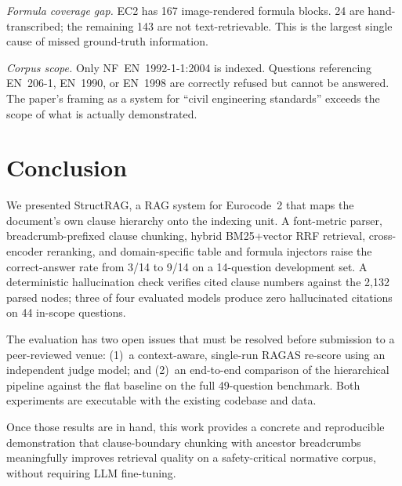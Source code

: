 \documentclass[conference]{IEEEtran}
\begin{document}
\textit{Formula coverage gap.}
EC2 has 167 image-rendered formula blocks.
24 are hand-transcribed; the remaining 143 are not text-retrievable.
This is the largest single cause of missed ground-truth information.

\textit{Corpus scope.}
Only NF~EN~1992-1-1:2004 is indexed.
Questions referencing EN~206-1, EN~1990, or EN~1998 are correctly
refused but cannot be answered.
The paper's framing as a system for ``civil engineering standards''
exceeds the scope of what is actually demonstrated.

\section{Conclusion}
\label{sec:conclusion}

We presented StructRAG, a RAG system for Eurocode~2 that maps the
document's own clause hierarchy onto the indexing unit.
A font-metric parser, breadcrumb-prefixed clause chunking, hybrid
BM25+vector RRF retrieval, cross-encoder reranking, and domain-specific
table and formula injectors raise the correct-answer rate from 3/14 to
9/14 on a 14-question development set.
A deterministic hallucination check verifies cited clause numbers
against the 2{,}132 parsed nodes; three of four evaluated models
produce zero hallucinated citations on 44 in-scope questions.

The evaluation has two open issues that must be resolved before
submission to a peer-reviewed venue: (1)~a context-aware, single-run
RAGAS re-score using an independent judge model; and (2)~an end-to-end
comparison of the hierarchical pipeline against the flat baseline on
the full 49-question benchmark.
Both experiments are executable with the existing codebase and data.

Once those results are in hand, this work provides a concrete and
reproducible demonstration that clause-boundary chunking with ancestor
breadcrumbs meaningfully improves retrieval quality on a safety-critical
normative corpus, without requiring LLM fine-tuning.



\end{document}
